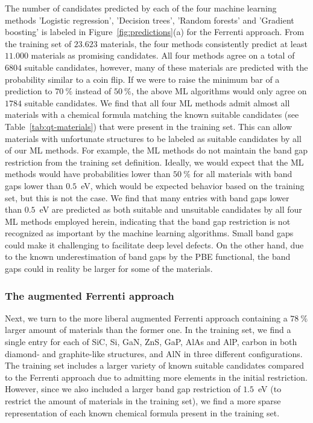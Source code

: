 \documentclass[superscriptaddress,unsortedaddress,
 amsmath,amssymb,
 aps,
]{revtex4-2}
\begin{document}
The number of candidates predicted by each of the four machine learning methods 'Logistic regression', 'Decision trees', 'Random forests' and 'Gradient boosting' is labeled in Figure~\ref{fig:predictions}(a) for the Ferrenti approach. 
From the training set of $23.623$ materials, the four methods consistently predict at least $11.000$ materials as promising candidates. All four methods agree on a total of $6804$ suitable candidates, however, many of these materials are predicted with the probability similar to a coin flip. 
If we were to raise the minimum bar of a prediction to $70 \ \%$ instead of $50 \ \%$, the above ML algorithms would only agree on $1784$ suitable candidates. 
We find that all four ML methods admit almost all materials with a chemical formula matching the known suitable candidates (see Table~\ref{tab:qt-materials}) that were present in the training set. 
This can allow materials with unfortunate structures to be labeled as suitable candidates by all of our ML methods. 
For example, the ML methods do not maintain the band gap restriction from the training set definition. 
Ideally, we would expect that the ML methods would have probabilities lower than $50 \ \%$ for all materials with band gaps lower than $0.5$~eV, which would be expected behavior based on the training set, but this is not the case. 
We find that many entries with band gaps lower than $0.5$~eV are predicted as both suitable and unsuitable candidates by all four ML methods employed herein, 
indicating that the band gap restriction is not recognized as important by the machine learning algorithms. 
Small band gaps could make it challenging to facilitate deep level defects. 
On the other hand, due to the known underestimation of band gaps by the PBE functional, the band gaps could in reality be larger for some of the materials. 

\subsubsection*{The augmented Ferrenti approach}
Next, we turn to the more liberal augmented Ferrenti approach containing a $78 \ \%$ larger amount of materials than the former one. In the training set, we find a single entry for each of SiC, Si, GaN, ZnS, GaP, AlAs and AlP, carbon in both diamond- and graphite-like structures, and AlN in three different configurations. The training set includes a larger variety of 
known 
suitable candidates compared to the Ferrenti approach due to admitting more elements in the initial restriction. However, since we also included a larger band gap restriction of $1.5$~eV (to restrict the amount of materials in the training set), we find a more sparse representation of each known 
chemical formula present in the training set. 
\end{document}
